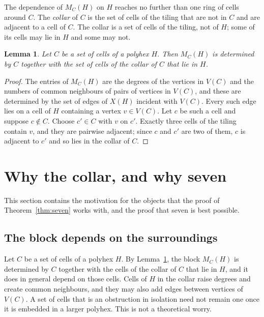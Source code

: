 \documentclass[11pt]{article}
\newtheorem{lemma}[theorem]{Lemma}
\theoremstyle{definition}
\begin{document}
The dependence of $M_C(H)$ on $H$ reaches no further than one ring of cells
around $C$.  The \textsl{collar} of $C$ is the set of cells of the tiling
that are not in $C$ and are adjacent to a cell of $C$.  The collar is a set
of cells of the tiling, not of $H$; some of its cells may lie in $H$ and some
may not.

\begin{lemma}\label{lem:collar}
Let $C$ be a set of cells of a polyhex $H$.  Then $M_C(H)$ is determined by
$C$ together with the set of cells of the collar of $C$ that lie in $H$.
\end{lemma}

\begin{proof}
The entries of $M_C(H)$ are the degrees of the vertices in $V(C)$ and the
numbers of common neighbours of pairs of vertices in $V(C)$, and these are
determined by the set of edges of $X(H)$ incident with $V(C)$.  Every such
edge lies on a cell of $H$ containing a vertex $v\in V(C)$.  Let $c$ be such
a cell and suppose $c\notin C$.  Choose $c'\in C$ with $v$ on $c'$.  Exactly
three cells of the tiling contain $v$, and they are pairwise adjacent; since
$c$ and $c'$ are two of them, $c$ is adjacent to $c'$ and so lies in the
collar of $C$.
\end{proof}

\section{Why the collar, and why seven}\label{sec:why}

This section contains the motivation for the objects that the proof of
Theorem~\ref{thm:seven} works with, and the proof that seven is best
possible.

\subsection{The block depends on the surroundings}

Let $C$ be a set of cells of a polyhex $H$.  By Lemma~\ref{lem:collar}, the
block $M_C(H)$ is determined by $C$ together with the cells of the collar of
$C$ that lie in $H$, and it does in general depend on those cells.
Cells of $H$ in the collar raise degrees and create common neighbours, and
they may also add edges between vertices of $V(C)$.  A set of cells that is
an obstruction in isolation need not remain one once it is embedded in a
larger polyhex.  This is not a theoretical worry.
\end{document}
